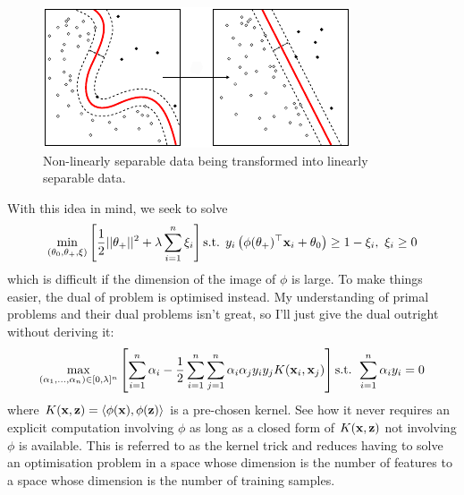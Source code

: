 \documentclass[11pt]{article}
\begin{document}

\begin{figure}[t]
    \centering
    \begin{minipage}{0.59\linewidth}
        \includegraphics[width=\linewidth]{./figures/supervised_learning/SVM_non_linear.pdf}
    \end{minipage}%
    \hfill
    \begin{minipage}{0.4\linewidth}
        \caption{Non-linearly separable data being transformed into linearly separable data.}
        \label{fig:SVM_non_linear}
    \end{minipage}
\end{figure}

With this idea in mind, we seek to solve
$$
\min_{(\theta_0,\theta_+,\xi)}\left[\frac{1}{2}||\theta_+||^2+\lambda\sum_{i=1}^n\xi_i\right]\text{s.t. } y_i\left(\phi(\theta_+)^\top\mathbf{x}_i+\theta_0\right)\geq 1-\xi_i,\text{ }\xi_i\geq0
$$
which is difficult if the dimension of the image of $\phi$ is large. To make things easier, the dual of problem is optimised instead. My understanding of primal problems and their dual problems isn't great, so I'll just give the dual outright without deriving it:
$$
\max_{(\alpha_1,\dots,\alpha_n)\in[0,\lambda]^n}\left[\sum_{i=1}^n\alpha_i-\frac{1}{2}\sum_{i=1}^n\sum_{j=1}^n\alpha_i\alpha_jy_iy_jK(\mathbf{x}_i,\mathbf{x}_j)\right]\text{s.t. }\sum_{i=1}^n\alpha_iy_i=0
$$
where $K(\mathbf{x},\mathbf{z})=\langle\phi(\mathbf{x}),\phi(\mathbf{z})\rangle$ is a pre-chosen kernel. See how it never requires an explicit computation involving $\phi$ as long as a closed form of $K(\mathbf{x},\mathbf{z})$ not involving $\phi$ is available. This is referred to as the kernel trick and reduces having to solve an optimisation problem in a space whose dimension is the number of features to a space whose dimension is the number of training samples.
\end{document}
